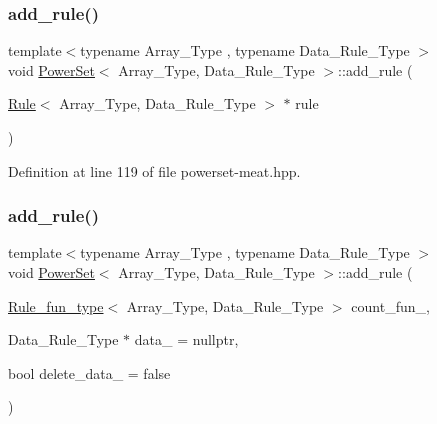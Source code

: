 \subsubsection{\texorpdfstring{add\+\_\+rule()}{add\_rule()}\hspace{0.1cm}{\footnotesize\ttfamily [2/3]}}
{\footnotesize\ttfamily template$<$typename Array\+\_\+\+Type , typename Data\+\_\+\+Rule\+\_\+\+Type $>$ \\
void \hyperlink{class_power_set}{Power\+Set}$<$ Array\+\_\+\+Type, Data\+\_\+\+Rule\+\_\+\+Type $>$\+::add\+\_\+rule (\begin{DoxyParamCaption}\item[{\hyperlink{class_rule}{Rule}$<$ Array\+\_\+\+Type, Data\+\_\+\+Rule\+\_\+\+Type $>$ $\ast$}]{rule }\end{DoxyParamCaption})\hspace{0.3cm}{\ttfamily [inline]}}



Definition at line 119 of file powerset-\/meat.\+hpp.

\mbox{\label{class_power_set_aae5eae12186fff037efa3884ac2b3dcc}} 
\subsubsection{\texorpdfstring{add\+\_\+rule()}{add\_rule()}\hspace{0.1cm}{\footnotesize\ttfamily [3/3]}}
{\footnotesize\ttfamily template$<$typename Array\+\_\+\+Type , typename Data\+\_\+\+Rule\+\_\+\+Type $>$ \\
void \hyperlink{class_power_set}{Power\+Set}$<$ Array\+\_\+\+Type, Data\+\_\+\+Rule\+\_\+\+Type $>$\+::add\+\_\+rule (\begin{DoxyParamCaption}\item[{\hyperlink{typedefs_8hpp_a2e147c9c0e8b65be614c98a5dd400d5c}{Rule\+\_\+fun\+\_\+type}$<$ Array\+\_\+\+Type, Data\+\_\+\+Rule\+\_\+\+Type $>$}]{count\+\_\+fun\+\_\+,  }\item[{Data\+\_\+\+Rule\+\_\+\+Type $\ast$}]{data\+\_\+ = {\ttfamily nullptr},  }\item[{bool}]{delete\+\_\+data\+\_\+ = {\ttfamily false} }\end{DoxyParamCaption})\hspace{0.3cm}{\ttfamily [inline]}}



